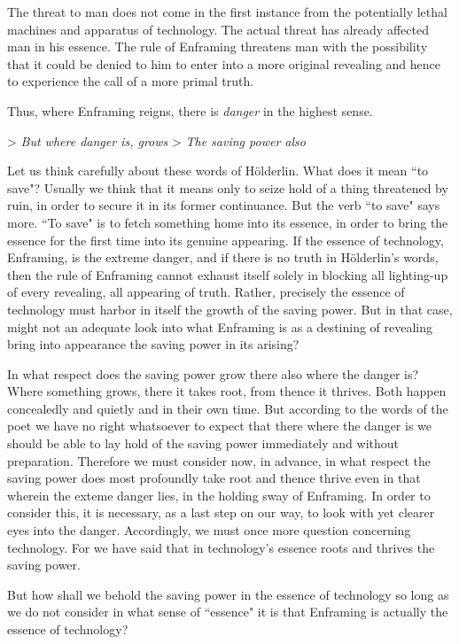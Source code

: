 The threat to man does not come in the first instance from the potentially lethal machines and apparatus of technology. The actual threat has already affected man in his essence. The rule of Enframing threatens man with the possibility that it could be denied to him to enter into a more original revealing and hence to experience the call of a more primal truth.

Thus, where Enframing reigns, there is \textit{danger} in the highest sense.

> \textit{But where danger is, grows}
> \textit{The saving power also}

Let us think carefully about these words of H\"{o}lderlin. What does it mean ``to save"? Usually we think that it means only to seize hold of a thing threatened by ruin, in order to secure it in its former continuance. But the verb ``to save" says more. ``To save" is to fetch something home into its essence, in order to bring the essence for the first time into its genuine appearing. If the essence of technology, Enframing, is the extreme danger, and if there is no truth in H\"{o}lderlin's words, then the rule of Enframing cannot exhaust itself solely in blocking all lighting-up of every revealing, all appearing of truth. Rather, precisely the essence of technology must harbor in itself the growth of the saving power. But in that case, might not an adequate look into what Enframing is as a destining of revealing bring into appearance the saving power in its arising? 

In what respect does the saving power grow there also where the danger is? Where something grows, there it takes root, from thence it thrives. Both happen concealedly and quietly and in their own time. But according to the words of the poet we have no right whatsoever to expect that there where the danger is we should be able to lay hold of the saving power immediately and without preparation. Therefore we must consider now, in advance, in what respect the saving power does most profoundly take root and thence thrive even in that wherein the exteme danger lies, in the holding sway of Enframing. In order to consider this, it is necessary, as a last step on our way, to look with yet clearer eyes into the danger. Accordingly, we must once more question concerning technology. For we have said that in technology's essence roots and thrives the saving power.

But how shall we behold the saving power in the essence of technology so long as we do not consider in what sense of ``essence" it is that Enframing is actually the essence of technology?

